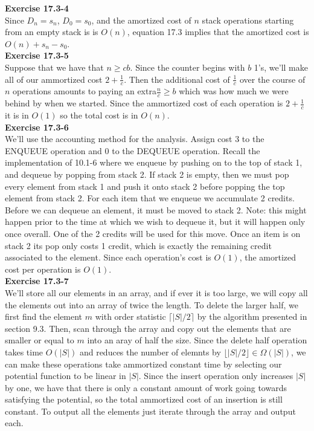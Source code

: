 \documentclass{article}
\begin{document}
\noindent\textbf{Exercise 17.3-4}\\

Since $D_n = s_n$, $D_0 = s_0$, and the amortized cost of $n$ stack operations starting from an empty stack is is $O(n)$, equation 17.3 implies that the amortized cost is $O(n) + s_n - s_0$.\\

\noindent\textbf{Exercise 17.3-5}\\

Suppose that we have that $n\ge c b$. Since the counter begins with $b$ 1's, we'll make all of our ammortized cost $2+ \frac{1}{c}$. Then the additional cost of $\frac{1}{c}$ over the course of $n$ operations amounts to paying an extra$\frac{n}{c} \ge b$ which was how much we were behind by when we started. Since the ammortized cost of each operation is $2+\frac{1}{c}$ it is in $O(1)$ so the total cost is in $O(n)$.\\

\noindent\textbf{Exercise 17.3-6}\\

We'll use the accounting method for the analysis.  Assign cost 3 to the ENQUEUE operation and 0 to the DEQUEUE operation.  Recall the implementation of 10.1-6 where we enqueue by pushing on to the top of stack 1, and dequeue by popping from stack 2.  If stack 2 is empty, then we must pop every element from stack 1 and push it onto stack 2 before popping the top element from stack 2.  For each item that we enqueue we accumulate 2 credits.  Before we can dequeue an element, it must be moved to stack 2.  Note: this might happen prior to the time at which we wish to dequeue it, but it will happen only once overall.  One of the 2 credits will be used for this move.  Once an item is on stack 2 its pop only costs 1 credit, which is exactly the remaining credit associated to the element.  Since each operation's cost is $O(1)$, the amortized cost per operation is $O(1)$.\\

\noindent\textbf{Exercise 17.3-7}\\

We'll store all our elements in an array, and if ever it is too large, we will copy all the elements out into an array of twice the length. To delete the larger half, we first find the element $m$ with order statistic $\lceil|S|/2\rceil$ by the algorithm presented in section 9.3. Then, scan through the array and copy out the elements that are smaller or equal to $m$ into an aray of half the size. Since the delete half operation takes time $O(|S|)$ and reduces the number of elemnts by $\lfloor|S|/2\rfloor \in \Omega(|S|)$, we can make these operations take ammortized constant time by selecting our potential function to be linear in $|S|$. Since the insert operation only increases $|S|$ by one, we have that there is only a constant amount of work going towards satisfying the potential, so the total ammortized cost of an insertion is still constant. To output all the elements just iterate through the array and output each.\\
\end{document}
